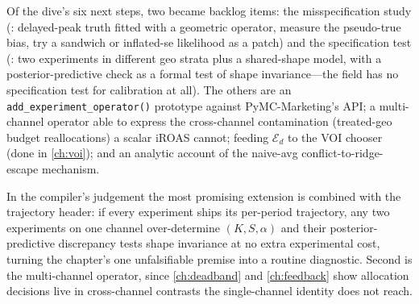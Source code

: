 Of the dive's six next steps, two became backlog items: the misspecification study (: delayed-peak truth fitted with a geometric operator, measure the pseudo-true bias, try a sandwich or inflated-se likelihood as a patch) and the specification test (: two experiments in different geo strata plus a shared-shape model, with a posterior-predictive check as a formal test of shape invariance---the field has no specification test for calibration at all). The others are an \texttt{add\_experiment\_operator()} prototype against PyMC-Marketing's API; a multi-channel operator able to express the cross-channel contamination (treated-geo budget reallocations) a scalar iROAS cannot; feeding $\mathcal E_d$ to the VOI chooser (done in \cref{ch:voi}); and an analytic account of the naive-avg conflict-to-ridge-escape mechanism.

In the compiler's judgement the most promising extension is  combined with the trajectory header: if every experiment ships its per-period trajectory, any two experiments on one channel over-determine $(K, S, \alpha)$ and their posterior-predictive discrepancy tests shape invariance at no extra experimental cost, turning the chapter's one unfalsifiable premise into a routine diagnostic. Second is the multi-channel operator, since \cref{ch:deadband} and \cref{ch:feedback} show allocation decisions live in cross-channel contrasts the single-channel identity does not reach.

